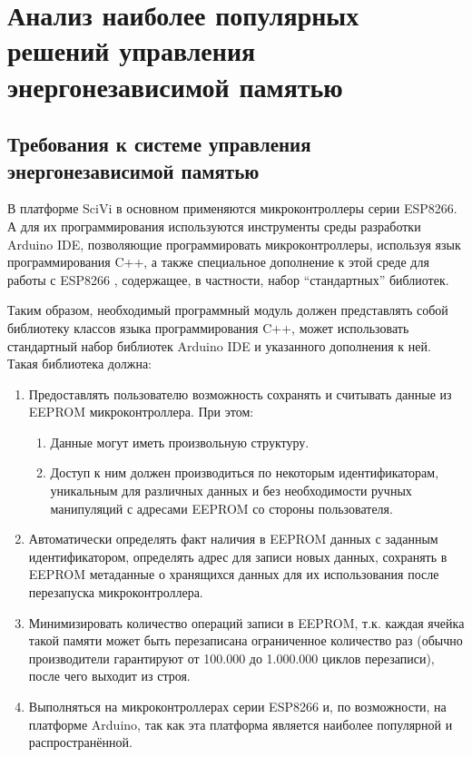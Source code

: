 \chapter{Анализ наиболее популярных решений управления энергонезависимой памятью}

\section{Требования к системе управления энергонезависимой памятью} \label{section:requirements}

В платформе SciVi в основном применяются микроконтроллеры серии ESP8266. А для их программирования используются инструменты среды разработки Arduino IDE, позволяющие программировать микроконтроллеры, используя язык программирования C++, а также специальное дополнение к этой среде для работы с ESP8266 \cite{web:esp-core}, содержащее, в частности, набор “стандартных” библиотек.

Таким образом, необходимый программный модуль должен представлять собой библиотеку классов языка программирования C++, может использовать стандартный набор библиотек Arduino IDE и указанного дополнения к ней.
Такая библиотека должна:
\begin{enumerate}
	\item Предоставлять пользователю возможность сохранять и считывать данные из EEPROM микроконтроллера. При этом:
	\begin{enumerate}
		\item Данные могут иметь произвольную структуру.
		\item Доступ к ним должен производиться по некоторым  идентификаторам, уникальным для различных данных и без необходимости ручных манипуляций с адресами EEPROM со стороны пользователя.
	\end{enumerate}
	\item Автоматически определять факт наличия в EEPROM данных с заданным идентификатором, определять адрес для записи новых данных, сохранять в EEPROM метаданные о хранящихся данных для их использования после перезапуска микроконтроллера.
	\item Минимизировать количество операций записи в EEPROM, т.к. каждая ячейка такой памяти может быть перезаписана ограниченное количество раз (обычно производители гарантируют от 100.000 до 1.000.000 циклов перезаписи), после чего выходит из строя.
	\item Выполняться на микроконтроллерах серии ESP8266 и, по возможности, на платформе Arduino, так как эта платформа является наиболее популярной и распространённой.
\end{enumerate}

